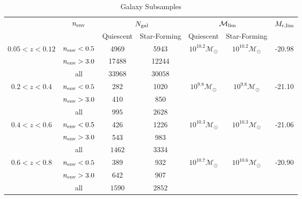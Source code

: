 \documentclass{emulateapj}
\def \lowenvthresh {0.5}
\def \highenvthresh {3.0}
\begin{document}
\begin{table*} 
  \caption{Galaxy Subsamples}
  \label{tab:subsample}
  \begin{center}
    \leavevmode
    \begin{tabular}{ccccccc} \hline \hline              
     &\multicolumn{1}{c}{$n_{\rm{env}}$}        & \multicolumn{2}{c}{$N_{\rm{gal}}$}  & \multicolumn{2}{c}{$\mathcal{M}_{\rm{lim}}$} & $M_{\rm{r}, lim}$ \\ 
    & & Quiescent & Star-Forming & Quiescent & Star-Forming &  \\ \hline 
$0.05 < z < 0.12$ & $n_{\rm{env}} < \lowenvthresh $ & 4969 & 5943 & $10^{10.2} \mathcal{M}_{\odot}$ & $10^{10.2} \mathcal{M}_{\odot}$ & -20.98 \\
               & $n_{\rm{env}} > \highenvthresh $ &17488 & 12244 &                          \\ 
                              & all          &$33968$                       & $30058$                          \\ \hline
$0.2 < z < 0.4$      &$n_{\rm{env}} < \lowenvthresh $           &282                    &1020 & $10^{9.8} \mathcal{M}_{\odot}$ & $10^{9.8} \mathcal{M}_{\odot}$ &-21.10 \\
               &$n_{\rm{env}} > \highenvthresh $            &410                    &850                           \\
               & all                & $995$                      & $2628$                          \\ \hline
$0.4 < z < 0.6$      &$n_{\rm{env}} < \lowenvthresh $           &426                       &1226 & $10^{10.3} \mathcal{M}_{\odot}$ & $10^{10.3} \mathcal{M}_{\odot}$ & -21.06 \\
               &$n_{\rm{env}} > \highenvthresh $            &543                       &983                           \\
               & all               & $1462$                      & $3334$                          \\ \hline
$0.6 < z < 0.8$      &$n_{\rm{env}} < \lowenvthresh $           &389                       &932  & $10^{10.7} \mathcal{M}_{\odot}$ & $10^{10.6} \mathcal{M}_{\odot}$ & -20.90 \\
               &$n_{\rm{env}} > \highenvthresh $            &642                       &907                           \\
               & all              & $1590$                      & $2852$                          \\ \hline

\end{tabular}
\end{center}
\end{table*}
\end{document}
